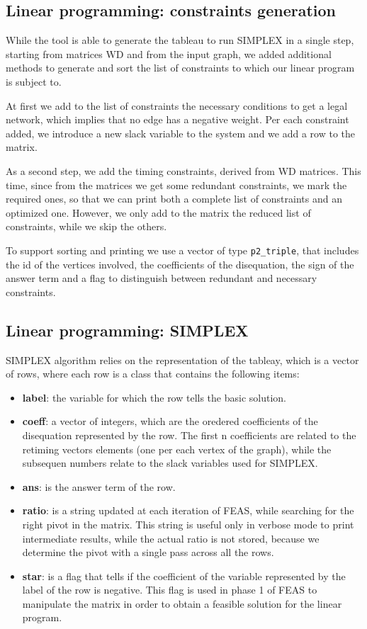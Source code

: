 \documentclass{acm_proc_article-sp}
\begin{document}
\subsection{Linear programming: constraints generation}

While the tool is able to generate the tableau to run SIMPLEX in a single step,
starting from matrices WD and from the input graph, we added additional
methods to generate and sort the list of constraints to which our linear
program is subject to.

At first we add to the list of constraints the necessary conditions to get a
legal network, which implies that no edge has a negative weight.
Per each constraint added, we introduce a new slack variable to the system
and we add a row to the matrix.

As a second step, we add the timing constraints, derived from WD matrices.
This time, since from the matrices we get some redundant constraints, we
mark the required ones, so that we can print both a complete list of
constraints and an optimized one. However, we only add to the matrix the
reduced list of constraints, while we skip the others.

To support sorting and printing we use a vector of type \texttt{p2\_triple},
that includes the id of the vertices involved, the coefficients of the
disequation, the sign of the answer term and a flag to distinguish between
redundant and necessary constraints.

\subsection{Linear programming: SIMPLEX}

SIMPLEX algorithm relies on the representation of the tableay, which is a
vector of rows, where each row is a class that contains the following items:
\begin{itemize}
  \item {\bf label}: the variable for which the row tells the basic solution.
  \item {\bf coeff}: a vector of integers, which are the oredered coefficients
    of the disequation represented by the row. The first n coefficients are
    related to the retiming vectors elements (one per each vertex of the graph),
    while the subsequen numbers relate to the slack variables used for SIMPLEX.
  \item {\bf ans}: is the answer term of the row.
  \item {\bf ratio}: is a string updated at each iteration of FEAS, while
    searching for the right pivot in the matrix. This string is useful only
    in verbose mode to print intermediate results, while the actual ratio
    is not stored, because we determine the pivot with a single pass across all
    the rows.
  \item {\bf star}: is a flag that tells if the coefficient of the variable
    represented by the label of the row is negative. This flag is used in
    phase 1 of FEAS to manipulate the matrix in order to obtain a feasible
    solution for the linear program.
\end{itemize}
\end{document}
